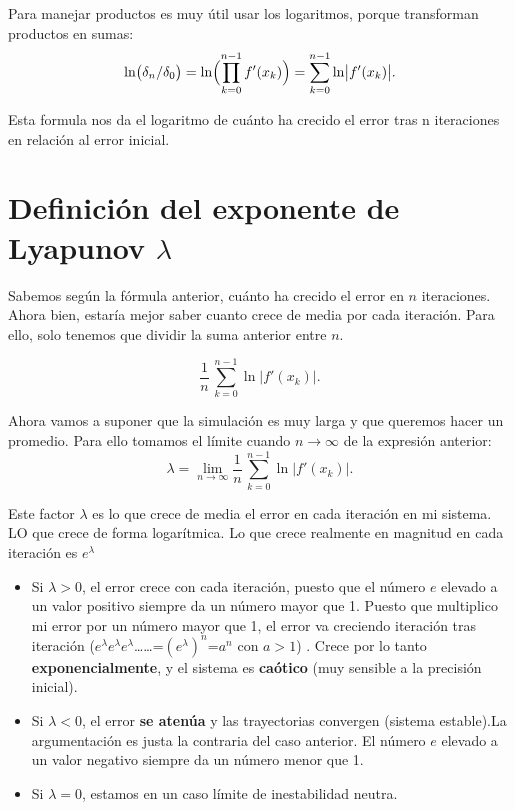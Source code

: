 \documentclass[
  10pt,
  a4paper,
  DIV=11,
  numbers=noendperiod,
  open=any]{scrreprt}
\providecommand{\tightlist}{%
  \setlength{\itemsep}{0pt}\setlength{\parskip}{0pt}}
\numberwithin{equation}{chapter}
\numberwithin{equation}{section}
\renewcommand{\[}{\begin{equation}}
\renewcommand{\]}{\end{equation}}
\begin{document}
Para manejar productos es muy útil usar los logaritmos, porque
transforman productos en sumas: \[
\ln\bigl(\delta_n/\delta_0\bigr)
= \ln\Bigl(\prod_{k=0}^{n-1} f'(x_k)\Bigr)
= \sum_{k=0}^{n-1}\ln\bigl|f'(x_k)\bigr|.
\]

Esta formula nos da el logaritmo de cuánto ha crecido el error tras n
iteraciones en relación al error inicial.

\section{\texorpdfstring{Definición del exponente de Lyapunov
\(\lambda\)}{Definición del exponente de Lyapunov \textbackslash lambda}}\label{definiciuxf3n-del-exponente-de-lyapunov-lambda}

Sabemos según la fórmula anterior, cuánto ha crecido el error en \(n\)
iteraciones. Ahora bien, estaría mejor saber cuanto crece de media por
cada iteración. Para ello, solo tenemos que dividir la suma anterior
entre \(n\).

\begin{equation}
\frac{1}{n}\,\sum_{k=0}^{n-1}\ln\bigl|f'(x_k)\bigr|.
\end{equation}

Ahora vamos a suponer que la simulación es muy larga y que queremos
hacer un promedio. Para ello tomamos el límite cuando \(n\to\infty\) de
la expresión anterior: \[
\lambda
= \lim_{n\to\infty}
\frac{1}{n}\,\sum_{k=0}^{n-1}\ln\bigl|f'(x_k)\bigr|.
\]

Este factor \(\lambda\) es lo que crece de media el error en cada
iteración en mi sistema. LO que crece de forma logarítmica. Lo que crece
realmente en magnitud en cada iteración es \(e^\lambda\)

\begin{itemize}
\tightlist
\item
  Si \(\lambda>0\), el error crece con cada iteración, puesto que el
  número \(e\) elevado a un valor positivo siempre da un número mayor
  que 1. Puesto que multiplico mi error por un número mayor que 1, el
  error va creciendo iteración tras iteración
  (\(e^\lambda\)\(e^\lambda\)\(e^\lambda\)\ldots\ldots=\((e^\lambda)^n\)=\(a^n\)
  con \(a>1\)) . Crece por lo tanto \textbf{exponencialmente}, y el
  sistema es \textbf{caótico} (muy sensible a la precisión inicial).
\item
  Si \(\lambda<0\), el error \textbf{se atenúa} y las trayectorias
  convergen (sistema estable).La argumentación es justa la contraria del
  caso anterior. El número \(e\) elevado a un valor negativo siempre da
  un número menor que 1.
\item
  Si \(\lambda=0\), estamos en un caso límite de inestabilidad neutra.
\end{itemize}
\end{document}
